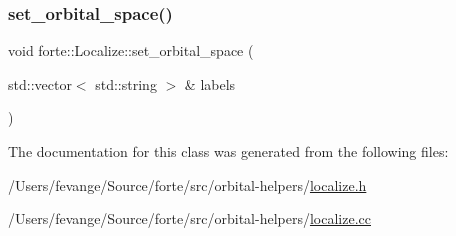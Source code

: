 \mbox{\label{classforte_1_1_localize_ae48978e53ec6af850793b8821797d877}} 
\subsubsection{\texorpdfstring{set\+\_\+orbital\+\_\+space()}{set\_orbital\_space()}\hspace{0.1cm}{\footnotesize\ttfamily [2/2]}}
{\footnotesize\ttfamily void forte\+::\+Localize\+::set\+\_\+orbital\+\_\+space (\begin{DoxyParamCaption}\item[{std\+::vector$<$ std\+::string $>$ \&}]{labels }\end{DoxyParamCaption})}



The documentation for this class was generated from the following files\+:\begin{DoxyCompactItemize}
\item 
/\+Users/fevange/\+Source/forte/src/orbital-\/helpers/\mbox{\hyperlink{localize_8h}{localize.\+h}}\item 
/\+Users/fevange/\+Source/forte/src/orbital-\/helpers/\mbox{\hyperlink{localize_8cc}{localize.\+cc}}\end{DoxyCompactItemize}
